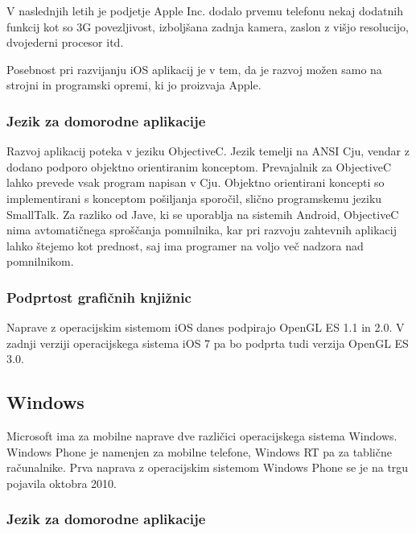 V naslednjih letih je podjetje Apple Inc. dodalo prvemu telefonu nekaj dodatnih funkcij kot so 3G povezljivost, izboljšana zadnja kamera, zaslon z višjo resolucijo, dvojederni procesor itd.

Posebnost pri razvijanju iOS aplikacij je v tem, da je razvoj možen samo na strojni in programski opremi, ki jo proizvaja Apple.

\subsubsection{Jezik za domorodne aplikacije} 

Razvoj aplikacij poteka v jeziku ObjectiveC. Jezik temelji na ANSI Cju, vendar z dodano podporo objektno orientiranim konceptom. Prevajalnik za ObjectiveC lahko prevede vsak program napisan v Cju. Objektno orientirani koncepti so implementirani s konceptom pošiljanja sporočil, slično programskemu jeziku SmallTalk. Za razliko od Jave, ki se uporablja na sistemih Android, ObjectiveC nima avtomatičnega sproščanja pomnilnika, kar pri razvoju zahtevnih aplikacij lahko štejemo kot prednost, saj ima programer na voljo več nadzora nad pomnilnikom. 

\subsubsection{Podprtost grafičnih knjižnic}

Naprave z operacijskim sistemom iOS danes podpirajo OpenGL ES 1.1 in 2.0. V zadnji verziji operacijskega sistema iOS 7 pa bo podprta tudi verzija OpenGL ES 3.0.

\subsection{Windows}

% 

Microsoft ima za mobilne naprave dve različici operacijskega sistema Windows. Windows Phone \cite{winphone} je namenjen za mobilne telefone, Windows RT pa za tablične računalnike. Prva naprava z operacijskim sistemom Windows Phone se je na trgu pojavila oktobra 2010.

\subsubsection{Jezik za domorodne aplikacije}

